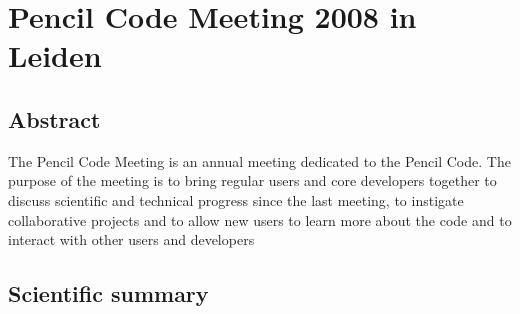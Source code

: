 \documentclass{article}
\begin{document}
\section*{Pencil Code Meeting 2008 in Leiden}

\subsection*{Abstract}

The Pencil Code Meeting is an annual meeting dedicated to the Pencil
Code. The purpose of the meeting is to bring regular users and core
developers together to discuss scientific and technical progress since
the last meeting, to instigate collaborative projects and to allow new
users to learn more about the code and to interact with other users
and developers

\subsection*{Scientific summary}
\end{document}
